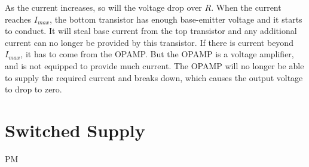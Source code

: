 As the current increases, so will the voltage drop over $R$. When the current reaches $I_{max}$, the bottom transistor has enough base-emitter voltage and it starts to conduct. It will steal base current from the top transistor and any additional current can no longer be provided by this transistor. If there is current beyond $I_{max}$, it has to come from the OPAMP. But the OPAMP is a voltage amplifier, and is not equipped to provide much current. The OPAMP will no longer be able to supply the required current and breaks down, which causes the output voltage to drop to zero.

\section{Switched Supply}

PM
